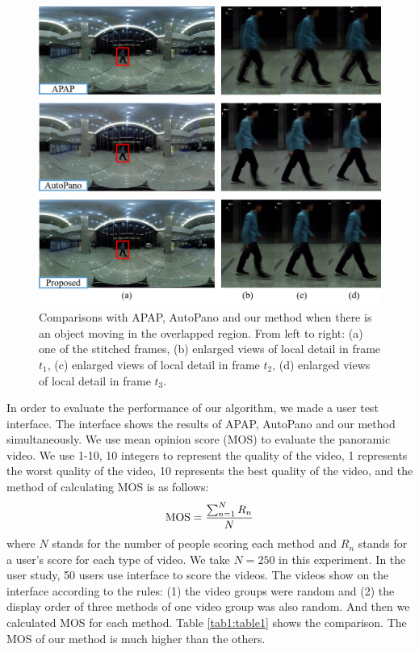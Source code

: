 \documentclass[conference]{IEEEtran}
\begin{document}
\begin{figure}[!htpb]
\centering
\includegraphics[scale=0.36]{picture36.png}
\caption{Comparisons with APAP, AutoPano and our method when there is an object moving in the overlapped region. From left to right: (a) one of the stitched frames, (b) enlarged views of local
detail in frame $t_1$, (c) enlarged views of local detail in frame $t_2$, (d) enlarged views of local detail in frame $t_3$.}
\label{fig:pic15}
\end{figure}

In order to evaluate the performance of our algorithm, we made a user test interface. The interface shows the results of APAP, AutoPano and our method simultaneously.
We use mean opinion score (MOS) to evaluate the panoramic video. We use 1-10, 10 integers to represent the quality of the video, 
1 represents the worst quality of the video, 10 represents the best quality of the video, and the method of calculating MOS is as follows:
\begin{equation}
{\rm MOS}=\frac{\sum^{N}_{n=1}{R_n}}{N}
\end{equation}
where $N$ stands for the number of people scoring each method and $R_n$ stands for a user's score for each type of video. We take $N=250$ in this experiment.
In the user study, 50 users use interface to score the videos. The videos show on the interface according to the rules: (1) the video groups were random and 
(2) the display order of three methods of one video group was also random.
And then we calculated MOS for each method. Table \ref{tab1:table1} shows the comparison. The MOS of our method is much higher than the others.
\end{document}
